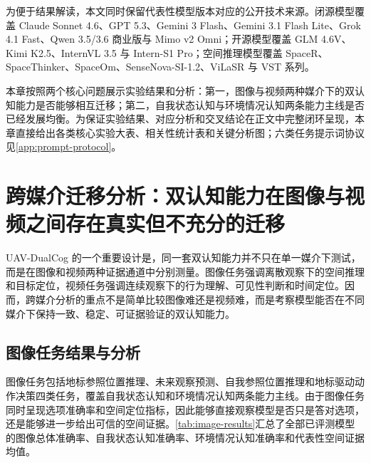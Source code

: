 为便于结果解读，本文同时保留代表性模型版本对应的公开技术来源。闭源模型覆盖 Claude Sonnet 4.6、GPT 5.3、Gemini 3 Flash、Gemini 3.1 Flash Lite、Grok 4.1 Fast、Qwen 3.5/3.6 商业版与 Mimo v2 Omni\cite{anthropic2026claude46,openai2026gpt53,deepmind2025gemini3flash,deepmind2026gemini31flashlite,xai2025grok41,qwen3.5,qwen36plus,mimo_v2_omni}；开源模型覆盖 GLM 4.6V、Kimi K2.5、InternVL 3.5 与 Intern-S1 Pro\cite{vteam2025glm45vglm41vthinkingversatilemultimodal,team2026kimi,wang2025internvl3_5,zou2026interns1proscientificmultimodalfoundation}；空间推理模型覆盖 SpaceR、SpaceThinker、SpaceOm、SenseNova-SI-1.2、ViLaSR 与 VST 系列\cite{ouyang2025spacer,SpaceThinker2025,SpaceOm2025,sensenova-si,wu2025reinforcing,yang2025visual}。

本章按照两个核心问题展示实验结果和分析：第一，图像与视频两种媒介下的双认知能力是否能够相互迁移；第二，自我状态认知与环境情况认知两条能力主线是否已经发展均衡。为保证实验结果、对应分析和交叉结论在正文中完整闭环呈现，本章直接给出各类核心实验大表、相关性统计表和关键分析图；六类任务提示词协议见\autoref{app:prompt-protocol}。

\newcommand{\resultgroup}[2]{\midrule\multicolumn{#1}{c}{#2} \\ \midrule}

\section{跨媒介迁移分析：双认知能力在图像与视频之间存在真实但不充分的迁移}

UAV-DualCog 的一个重要设计是，同一套双认知能力并不只在单一媒介下测试，而是在图像和视频两种证据通道中分别测量。图像任务强调离散观察下的空间推理和目标定位，视频任务强调连续观察下的行为理解、可见性判断和时间定位。因而，跨媒介分析的重点不是简单比较图像难还是视频难，而是考察模型能否在不同媒介下保持一致、稳定、可证据验证的双认知能力。

\subsection{图像任务结果与分析}

图像任务包括地标参照位置推理、未来观察预测、自我参照位置推理和地标驱动动作决策四类任务，覆盖自我状态认知和环境情况认知两条能力主线。由于图像任务同时呈现选项准确率和空间定位指标，因此能够直接观察模型是否只是答对选项，还是能够进一步给出可信的空间证据。\autoref{tab:image-results}汇总了全部已评测模型的图像总体准确率、自我状态认知准确率、环境情况认知准确率和代表性空间证据均值。

